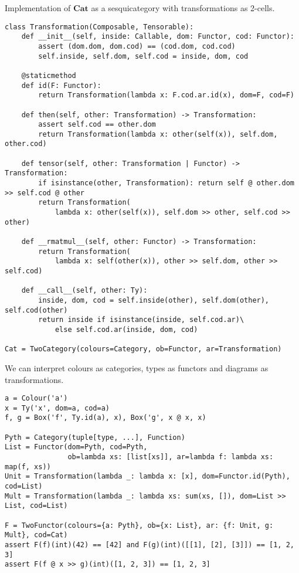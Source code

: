 \begin{python}\label{listing:Transformation}
{\normalfont Implementation of $\mathbf{Cat}$ as a sesquicategory with transformations as 2-cells.}

\begin{verbatim}
class Transformation(Composable, Tensorable):
    def __init__(self, inside: Callable, dom: Functor, cod: Functor):
        assert (dom.dom, dom.cod) == (cod.dom, cod.cod)
        self.inside, self.dom, self.cod = inside, dom, cod

    @staticmethod
    def id(F: Functor):
        return Transformation(lambda x: F.cod.ar.id(x), dom=F, cod=F)

    def then(self, other: Transformation) -> Transformation:
        assert self.cod == other.dom
        return Transformation(lambda x: other(self(x)), self.dom, other.cod)

    def tensor(self, other: Transformation | Functor) -> Transformation:
        if isinstance(other, Transformation): return self @ other.dom >> self.cod @ other
        return Transformation(
            lambda x: other(self(x)), self.dom >> other, self.cod >> other)

    def __rmatmul__(self, other: Functor) -> Transformation:
        return Transformation(
            lambda x: self(other(x)), other >> self.dom, other >> self.cod)

    def __call__(self, other: Ty):
        inside, dom, cod = self.inside(other), self.dom(other), self.cod(other)
        return inside if isinstance(inside, self.cod.ar)\
            else self.cod.ar(inside, dom, cod)

Cat = TwoCategory(colours=Category, ob=Functor, ar=Transformation)
\end{verbatim}
\end{python}

\begin{example}
We can interpret colours as categories, types as functors and diagrams as transformations.

\begin{verbatim}
a = Colour('a')
x = Ty('x', dom=a, cod=a)
f, g = Box('f', Ty.id(a), x), Box('g', x @ x, x)

Pyth = Category(tuple[type, ...], Function)
List = Functor(dom=Pyth, cod=Pyth,
               ob=lambda xs: [list[xs]], ar=lambda f: lambda xs: map(f, xs))
Unit = Transformation(lambda _: lambda x: [x], dom=Functor.id(Pyth), cod=List)
Mult = Transformation(lambda _: lambda xs: sum(xs, []), dom=List >> List, cod=List)

F = TwoFunctor(colours={a: Pyth}, ob={x: List}, ar: {f: Unit, g: Mult}, cod=Cat)
assert F(f)(int)(42) == [42] and F(g)(int)([[1], [2], [3]]) == [1, 2, 3]
assert F(f @ x >> g)(int)([1, 2, 3]) == [1, 2, 3]
\end{verbatim}
\end{example}

